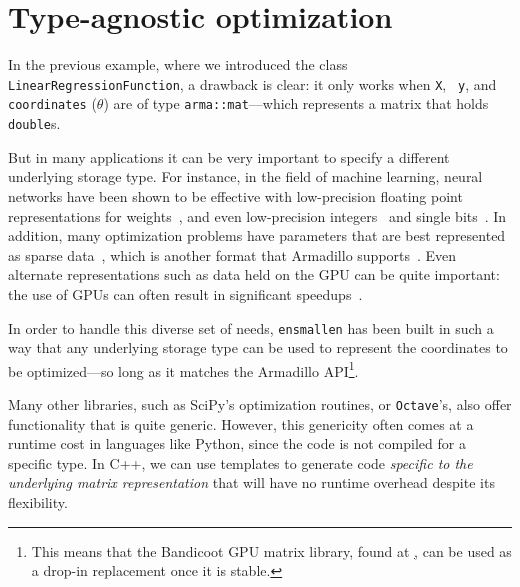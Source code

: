 \section{Type-agnostic optimization}
\label{sec:templated_optimize}


In the previous example, where we introduced the class {\tt
LinearRegressionFunction}, a drawback is clear: it only works when {\tt X}, {\tt
y}, and {\tt coordinates} ($\theta$) are of type {\tt arma::mat}---which
represents a matrix that holds {\tt double}s.

But in many applications it can be very important to specify a different
underlying storage type.  For instance, in the field of machine learning, neural
networks have been shown to be effective with low-precision floating point
representations for weights~\cite{vanhoucke2011improving}, and even low-precision
integers~\cite{courbariaux2015training} and single
bits~\cite{courbariaux2015binaryconnect}.  In addition, many
optimization problems have parameters that are best represented as sparse
data~\cite{van2011sparse, recht2011hogwild}, which is another format that
Armadillo supports~\cite{sanderson2018user, mca24030070}.
Even alternate representations such as data held on the GPU can be quite
important: the use of GPUs can often result in significant
speedups~\cite{oh2004gpu, athanasopoulos2011gpu}.

In order to handle this diverse set of needs, {\tt ensmallen} has been built in
such a way that any underlying storage type can be used to represent the
coordinates to be optimized---so long as it matches the Armadillo
API\footnote{This means that the Bandicoot GPU matrix library, found at
\href{https://gitlab.com/conradsnicta/bandicoot-code}, can be used as a drop-in
replacement once it is stable.}.

Many other libraries, such as SciPy's optimization routines, or {\tt Octave}'s,
also offer functionality that is quite generic.  However, this genericity often
comes at a runtime cost in languages like Python, since the code is not compiled
for a specific type.  In C++, we can use templates to generate code {\it
specific to the underlying matrix representation} that will have no runtime
overhead despite its flexibility.

